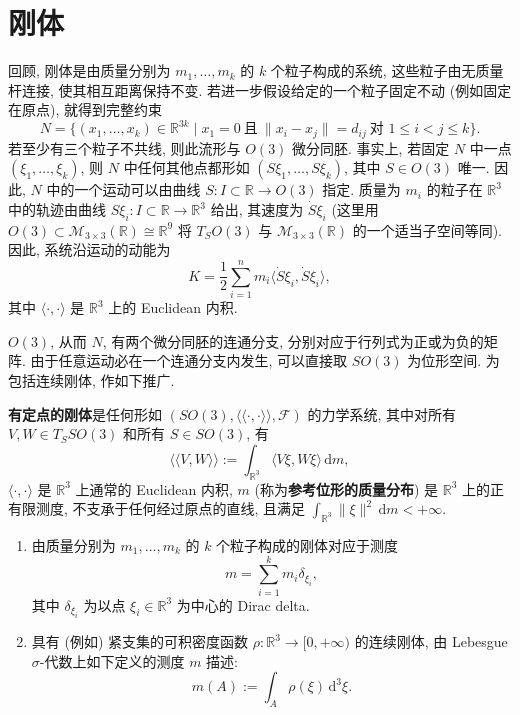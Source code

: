 \section{刚体}\label{sec:rigid-body}

回顾, 刚体是由质量分别为 $m_1,\ldots,m_k$ 的 $k$ 个粒子构成的系统, 这些粒子由无质量杆连接, 使其相互距离保持不变. 若进一步假设给定的一个粒子固定不动 (例如固定在原点), 就得到完整约束
\[
  N=\bigl\{(x_1,\ldots,x_k)\in\mathbb{R}^{3k}\mid x_1=0\ \text{且}\
    \lVert x_i-x_j\rVert=d_{ij}\ \text{对 }1\leq i<j\leq k\bigr\}.
\]
若至少有三个粒子不共线, 则此流形与 $O(3)$ 微分同胚. 事实上, 若固定 $N$ 中一点 $(\xi_1,\ldots,\xi_k)$, 则 $N$ 中任何其他点都形如 $(S\xi_1,\ldots,S\xi_k)$, 其中 $S\in O(3)$ 唯一. 因此, $N$ 中的一个运动可以由曲线 $S:I\subset\mathbb{R}\to O(3)$ 指定. 质量为 $m_i$ 的粒子在 $\mathbb{R}^3$ 中的轨迹由曲线 $S\xi_i:I\subset\mathbb{R}\to\mathbb{R}^3$ 给出, 其速度为 $\dot S\xi_i$ (这里用 $O(3)\subset\mathcal{M}_{3\times3}(\mathbb{R})\cong\mathbb{R}^9$ 将 $T_SO(3)$ 与 $\mathcal{M}_{3\times3}(\mathbb{R})$ 的一个适当子空间等同). 因此, 系统沿运动的动能为
\[
  K=\frac12\sum_{i=1}^n m_i\langle\dot S\xi_i,\dot S\xi_i\rangle,
\]
其中 $\langle\cdot,\cdot\rangle$ 是 $\mathbb{R}^3$ 上的 Euclidean 内积.

$O(3)$, 从而 $N$, 有两个微分同胚的连通分支, 分别对应于行列式为正或为负的矩阵. 由于任意运动必在一个连通分支内发生, 可以直接取 $SO(3)$ 为位形空间. 为包括连续刚体, 作如下推广.

\begin{RiemannDefinition}\label{def:rigid-body-with-fixed-point}
\textbf{有定点的刚体}是任何形如 $(SO(3),\langle\!\langle\cdot,\cdot\rangle\!\rangle,\mathcal{F})$ 的力学系统, 其中对所有 $V,W\in T_SSO(3)$ 和所有 $S\in SO(3)$, 有
\[
  \langle\!\langle V,W\rangle\!\rangle:=\int_{\mathbb{R}^3}\langle V\xi,W\xi\rangle\,\mathrm{d}m,
\]
$\langle\cdot,\cdot\rangle$ 是 $\mathbb{R}^3$ 上通常的 Euclidean 内积, $m$ (称为\textbf{参考位形的质量分布}) 是 $\mathbb{R}^3$ 上的正有限测度, 不支承于任何经过原点的直线, 且满足 $\int_{\mathbb{R}^3}\lVert\xi\rVert^2\,\mathrm{d}m<+\infty$.
\end{RiemannDefinition}

\begin{RiemannExample}\label{ex:discrete-and-continuous-rigid-bodies}
\begin{enumerate}[label=(\arabic*),leftmargin=*]
\item 由质量分别为 $m_1,\ldots,m_k$ 的 $k$ 个粒子构成的刚体对应于测度
\[
  m=\sum_{i=1}^k m_i\delta_{\xi_i},
\]
其中 $\delta_{\xi_i}$ 为以点 $\xi_i\in\mathbb{R}^3$ 为中心的 Dirac delta.
\item 具有 (例如) 紧支集的可积密度函数 $\rho:\mathbb{R}^3\to[0,+\infty)$ 的连续刚体, 由 Lebesgue $\sigma$-代数上如下定义的测度 $m$ 描述:
\[
  m(A):=\int_A\rho(\xi)\,\mathrm{d}^3\xi.
\]
\end{enumerate}
\end{RiemannExample}


